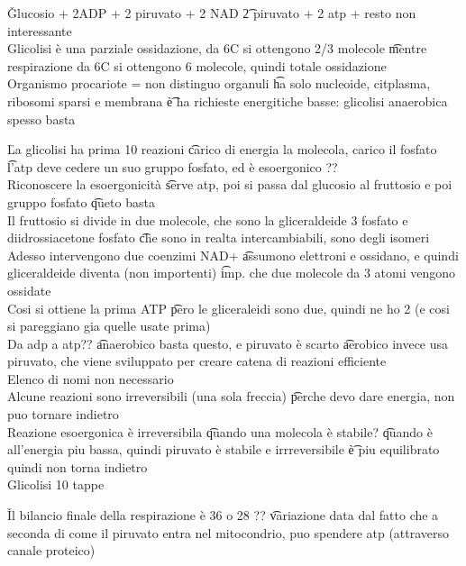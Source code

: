 \documentclass[12pt]{article}
\begin{document}
\v

Glucosio + 2ADP + 2 piruvato + 2 NAD \t 2 piruvato + 2 atp + resto non interessante \\
Glicolisi è una parziale ossidazione, da 6C si ottengono 2/3 molecole \t mentre respirazione da 6C si ottengono 6 molecole, quindi totale ossidazione \\
Organismo procariote = non distinguo organuli \t ha solo nucleoide, citplasma, ribosomi sparsi e membrana \t è ha richieste energitiche basse: glicolisi anaerobica spesso basta

\v

La glicolisi ha prima 10 reazioni \t carico di energia la molecola, carico il fosfato \t l'atp deve cedere un suo gruppo fosfato, ed è esoergonico  ?? \\
Riconoscere la esoergonicità \t serve atp, poi si passa dal glucosio al fruttosio e poi gruppo fosfato \t queto basta \\
Il fruttosio si divide in due molecole, che sono la gliceraldeide 3 fosfato e diidrossiacetone fosfato \t che sono in realta intercambiabili, sono degli isomeri \\
Adesso intervengono due coenzimi NAD+ \t assumono elettroni e ossidano, e quindi gliceraldeide diventa (non importenti) \t imp. che due molecole da 3 atomi vengono ossidate \\
Cosi si ottiene la prima ATP \t pero le gliceraleidi sono due, quindi ne ho 2 (e cosi si pareggiano gia quelle usate prima) \\
Da adp a atp?? \t anaerobico basta questo, e piruvato è scarto \t aerobico invece usa piruvato, che viene sviluppato per creare catena di reazioni efficiente \\
Elenco di nomi non necessario \\
Alcune reazioni sono irreversibili (una sola freccia) \t perche devo dare energia, non puo tornare indietro \\
Reazione esoergonica è irreversibila \t quando una molecola è stabile? \t quando è all'energia piu bassa, quindi piruvato è stabile e irrreversibile \t è piu equilibrato quindi non torna indietro \\
Glicolisi 10 tappe

\v

Il bilancio finale della respirazione è 36 o 28 ?? \t variazione data dal fatto che a seconda di come il piruvato entra nel mitocondrio, puo spendere atp (attraverso canale proteico)
\end{document}

